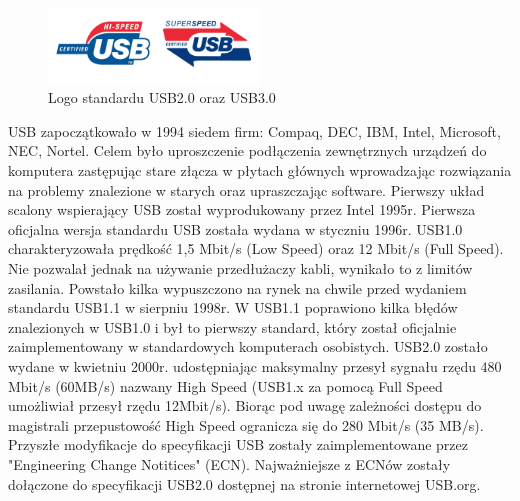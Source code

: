 \documentclass{BscUS}
\begin{document}
\begin{figure}[h]
\centering
\includegraphics[width=0.5\textwidth]{./img/usbLogo}
\caption{Logo standardu USB2.0 oraz USB3.0 \cite{usbLogo}}
\end{figure}
%
%
\indent USB zapoczątkowało w 1994 siedem firm: Compaq, DEC, IBM, Intel, Microsoft, NEC, Nortel. Celem było uproszczenie podłączenia zewnętrznych urządzeń do komputera zastępując stare złącza w płytach głównych wprowadzając rozwiązania na problemy znalezione w starych oraz upraszczając software.
Pierwszy układ scalony wspierający USB został wyprodukowany przez Intel 1995r.
\newline
\indent Pierwsza oficjalna wersja standardu USB została wydana w styczniu 1996r. USB1.0 charakteryzowała prędkość 1,5 Mbit/s (Low Speed) oraz 12 Mbit/s (Full Speed). Nie pozwalał jednak na używanie przedłużaczy kabli, wynikało to z limitów zasilania. %
Powstało kilka wypuszczono na rynek na chwile przed wydaniem standardu USB1.1 w sierpniu 1998r. W USB1.1 poprawiono kilka błędów znalezionych w USB1.0 i był to pierwszy standard, który został oficjalnie zaimplementowany w standardowych komputerach osobistych. \cite{USBSystemArch}
\newline
\indent USB2.0 zostało wydane w kwietniu 2000r. udostępniając maksymalny przesył sygnału rzędu 480 Mbit/s (60MB/s) nazwany High Speed (USB1.x za pomocą Full Speed umożliwiał przesył rzędu 12Mbit/s). Biorąc pod uwagę zależności dostępu do magistrali przepustowość High Speed ogranicza się do 280 Mbit/s (35 MB/s).
Przyszłe modyfikacje do specyfikacji USB zostały zaimplementowane przez "Engineering Change Notitices" (ECN). Najważniejsze z ECNów zostały dołączone do specyfikacji USB2.0 dostępnej na stronie internetowej USB.org.
\end{document}
